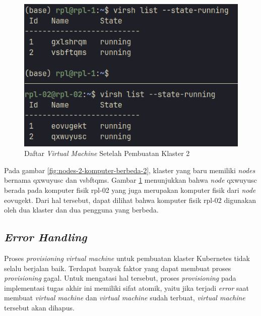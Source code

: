 \begin{figure}[H]
  \centering
  \includegraphics[scale=0.3]{gambar/ssh-nodes-list-2.png}
  \caption{Daftar \emph{Virtual Machine} Setelah Pembuatan Klaster 2}
  \label{fig:vm-komputer-fisik-2}
\end{figure}

Pada gambar \ref{fig:nodes-2-komputer-berbeda-2}, klaster yang baru
memiliki \emph{nodes} bernama qxwuyusc dan vsbftqms. Gambar \ref{fig:vm-komputer-fisik-2}
menunjukkan bahwa \emph{node} qxwuyusc berada pada komputer fisik rpl-02 yang juga
merupakan komputer fisik dari \emph{node} eovugekt. Dari hal tersebut, dapat
dilihat bahwa komputer fisik rpl-02 digunakan oleh dua klaster dan dua pengguna
yang berbeda.

\subsection{\emph{Error Handling}}
\label{subsec:error-handling}

Proses \emph{provisioning virtual machine} untuk pembuatan
klaster Kubernetes tidak selalu berjalan baik. Terdapat banyak
faktor yang dapat membuat proses \emph{provisioning} gagal. Untuk
mengatasi hal tersebut, proses \emph{provisioning} pada implementasi
tugas akhir ini memiliki sifat atomik, yaitu jika terjadi \emph{error}
saat membuat \emph{virtual machine} dan \emph{virtual machine} sudah terbuat,
\emph{virtual machine} tersebut akan dihapus.



\clearpage

